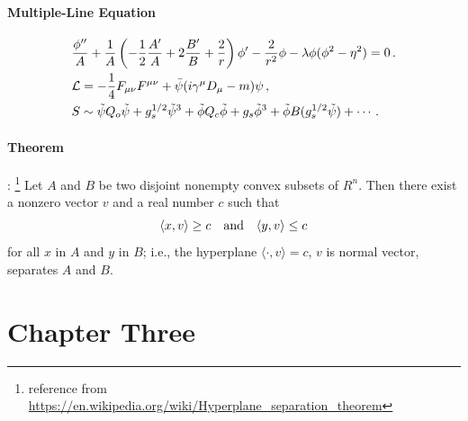 \documentclass[12pt, a4paper]{report}
\begin{document}
\subsubsection{Multiple-Line Equation}
\begin{eqnarray}
    & { \frac { \phi ^ { \prime \prime } } { A } } + { \frac { 1 } { A } } \left( - { \frac { 1 } { 2 } } { \frac { A ^ { \prime } } { A } } + 2 { \frac { B ^ { \prime } } { B } } + { \frac { 2 } { r } } \right) \phi ^ { \prime } - { \frac { 2 } { r ^ { 2 } } } \phi - \lambda \phi ( \phi ^ { 2 } - \eta ^ { 2 } ) = 0 \, . 
    \\
    & \begin{aligned}
        & { \cal L } = - { \frac { 1 } { 4 } } F _ { \mu \nu } F ^ { \mu \nu } + { \bar { \psi } } ( i \gamma ^ { \mu } D _ { \mu } - m ) \psi \, ,
        \\
        & S \sim \tilde { \psi } Q _ { o } \tilde { \psi } + g _ { s } ^ { 1 / 2 } \tilde { \psi } ^ { 3 } + \tilde { \phi } Q _ { c } \tilde { \phi } + g _ { s } \tilde { \phi } ^ { 3 } + \tilde { \phi } B ( g _ { s } ^ { 1 / 2 } \tilde { \psi } ) + \cdots .
    \end{aligned}
\end{eqnarray}

\subsubsection{Theorem}
\begin{theorem} : \footnote{reference from \url{https://en.wikipedia.org/wiki/Hyperplane_separation_theorem}}
	Let $A$ and $B$ be two disjoint nonempty convex subsets of $R^n$. 
	Then there exist a nonzero vector $v$ and a real number $c$ such that
	\begin{equation*}
		\langle x,v \rangle \geq c \quad \text{\rm and} \quad\langle y,v \rangle \leq c 
	\end{equation*}\label{theor:sat}
   for all $x$ in $A$ and $y$ in $B$; i.e., the hyperplane $\langle\cdot ,v \rangle =c $, $v$ is normal vector, separates $A$ and $B$. 
\end{theorem}
\newpage
\chapter{Chapter Three}
\lhead{\Etitle}
    \setlength{\parskip}{0pt}
\end{document}
